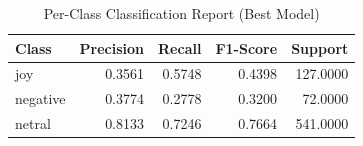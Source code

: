 \begin{table}[htbp]
\centering
\caption{Per-Class Classification Report (Best Model)}
\label{tab:table6}
\small
\begin{tabular}{lrrrr}
\toprule
Class & Precision & Recall & F1-Score & Support \\
\midrule
joy & 0.3561 & 0.5748 & 0.4398 & 127.0000 \\
negative & 0.3774 & 0.2778 & 0.3200 & 72.0000 \\
netral & 0.8133 & 0.7246 & 0.7664 & 541.0000 \\
\bottomrule
\end{tabular}
\end{table}
